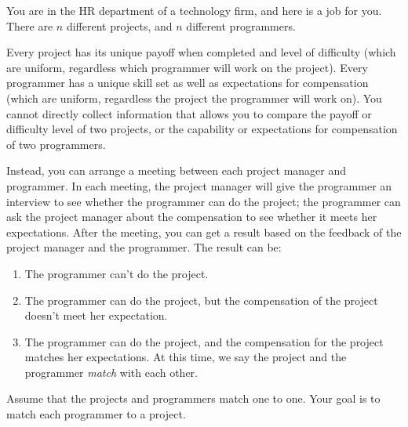 \documentclass[11pt]{article}
\begin{document}
You are in the HR department of a
technology firm, and here is a job for you.  There are $n$ different
projects, and $n$ different programmers.

Every project has its unique payoff when completed and level of
difficulty (which are uniform, regardless which programmer will work
on the project).  Every programmer has a unique skill set as well as
expectations for compensation (which are uniform, regardless the
project the programmer will work on). You cannot directly collect
information that allows you to compare the payoff or difficulty level
of two projects, or the capability or expectations for compensation of
two programmers.

Instead, you can arrange a meeting between each project manager and
programmer.  In each meeting, the project manager will give the
programmer an interview to see whether the programmer can do the
project; the programmer can ask the project manager about the
compensation to see whether it meets her expectations.  After the
meeting, you can get a result based on the feedback of the project
manager and the programmer.  The result can be:

\begin{enumerate}
  \item The programmer can't do the project.
  \item The programmer can do the project, but the compensation of the
    project doesn't meet her expectation.
  \item The programmer can do the project, and the compensation for
    the project matches her expectations. At this time, we say the
    project and the programmer \textit{match} with each other.
\end{enumerate}

Assume that the projects and programmers match one to one. Your goal
is to match each programmer to a project.
\end{document}
